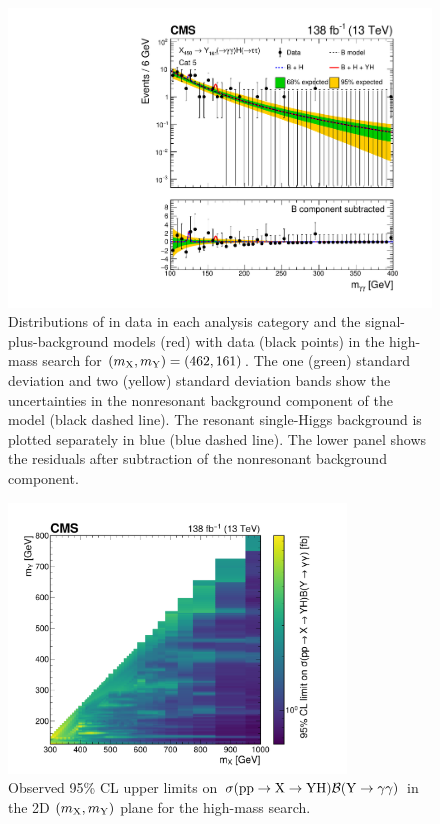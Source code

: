 \begin{figure}
    \includegraphics[width=.45\linewidth]{Figures/Dihiggs/results/sb_models/y_gg_high_mass/ARCGL_Y_gg_High_Mass_mx450my164mh161_ggttresmx450my164cat5_CMS_hgg_mass_nbins50_paper.pdf}
    \caption[Signal-Plus-Background Fits to Data for High-Mass \XYggHtt Search at $(\mX,\mY)=(462,161)$\GeV]{Distributions of \mgg in data in each analysis category and the signal-plus-background models (red) with data (black points) in the high-mass \XYggHtt search for $(\mX,\mY)=(462,161)$\GeV. The one (green) standard deviation and two (yellow) standard deviation bands show the uncertainties in the nonresonant background component of the model (black dashed line). The resonant single-Higgs background is plotted separately in blue (blue dashed line). The lower panel shows the residuals after subtraction of the nonresonant background component.}\label{fig:sbmodel_5}
\end{figure}


\begin{figure}
    \centering
    \includegraphics[width=0.8\textwidth]{Figures/Dihiggs/results/limits/limits_2d_obs_y_gg_high_mass_paper.pdf}
    \caption[High-Mass \XYggHtt Upper Limits in the 2D $(\mX,\mY)$ Plane]{Observed 95\% CL upper limits on $\sigma(\mathrm{p}\mathrm{p} \to \mathrm{X} \to \mathrm{Y}\mathrm{H})\mathcal{B}(\mathrm{Y} \to \gamma\gamma)$ in the 2D $(\mX,\mY)$ plane for the high-mass \XYggHtt search.}\label{fig:limits_2d_obs_y_gg_high_mass}
\end{figure}

